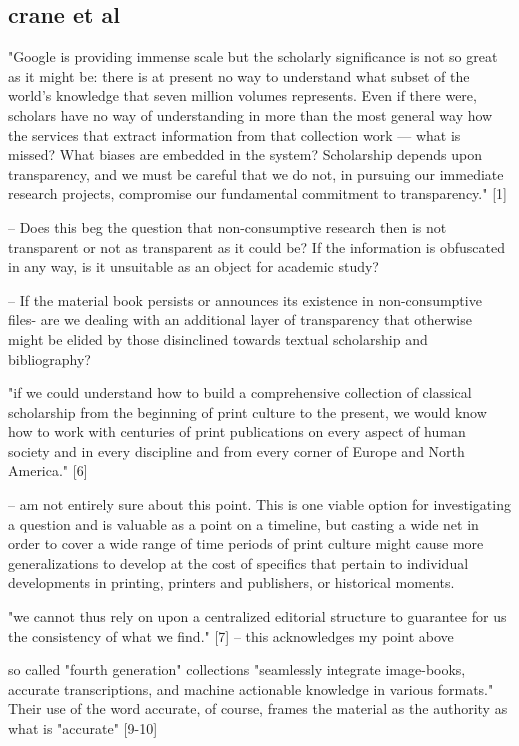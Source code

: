 \documentclass[course, english]{Notes}
\begin{document}
\subsection{crane et al}
 "Google is providing immense scale but the scholarly significance is not so great as it might be: there is at present no way to understand what subset of the world’s knowledge that seven million volumes represents. Even if there were, scholars have no way of understanding in more than the most general way how the services that extract information from that collection work — what is missed? What biases are embedded in the system? Scholarship depends upon transparency, and we must be careful that we do not, in pursuing our immediate research projects, compromise our fundamental commitment to transparency." [1]


	-- {Does this beg the question that non-consumptive research then is not transparent or not as transparent as it could be? If the information is obfuscated in any way, is it unsuitable as an object for academic study?}
	
	-- {If the material book persists or announces its existence in non-consumptive files- are we dealing with an additional layer of transparency that otherwise might be elided by those disinclined towards textual scholarship and bibliography?}
	
 "if we could understand how to build a comprehensive collection of classical scholarship from the beginning of print culture to the present, we would know how to work with centuries of print publications on every aspect of human society and in every discipline and from every corner of Europe and North America." [6]
	
	--  {am not entirely sure about this point. This is one viable option for investigating a question and is valuable as a point on a timeline, but casting a wide net in order to cover a wide range of time periods of print culture might cause more generalizations to develop at the cost of specifics that pertain to individual developments in printing, printers and publishers, or historical moments.}

"we cannot thus rely on upon a centralized editorial structure to guarantee for us the consistency of what we find." [7]
			-- {this acknowledges my point above}
			
{so called "fourth generation" collections "seamlessly integrate image-books, accurate transcriptions, and machine actionable knowledge in various formats." Their use of the word accurate, of course, frames the material as the authority as what is "accurate"} [9-10]
\end{document}
